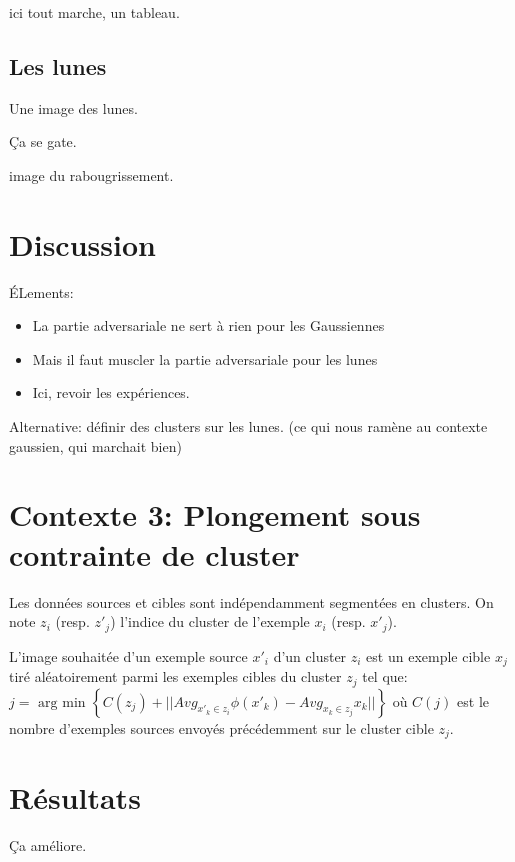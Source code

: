 ici tout marche, un tableau.

\subsection{Les lunes}
Une image des lunes.

Ça se gate.

image du rabougrissement.

\section{Discussion}
ÉLements:
\begin{itemize}
\item La partie adversariale ne sert à rien pour les Gaussiennes
\item Mais il faut muscler la partie adversariale pour les lunes
\item Ici, revoir les expériences.
\end{itemize}

Alternative: définir des clusters sur les lunes.
(ce qui nous ramène au contexte gaussien, qui marchait bien)

\section{Contexte 3: Plongement sous contrainte de cluster}

Les données sources et cibles sont indépendamment segmentées en clusters.
On note $z_i$ (resp. $z'_j$) l'indice du cluster de l'exemple $x_i$ (resp. $x'_j$). 

L'image souhaitée d'un exemple source $x'_i$ d'un cluster $z_i$ est un exemple cible $x_j$ tiré aléatoirement parmi les exemples cibles du cluster $z_j$ tel que: 
$j = \mbox{~arg min~} \left\{C(z_j) + || Avg_{x'_k \in z_i} \phi(x'_k) - Avg_{x_k \in z_j} x_k || \right\}$
où $C(j)$ est le nombre d'exemples sources envoyés précédemment sur le cluster cible $z_j$.

\section{Résultats}
Ça améliore.
